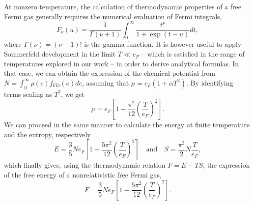 At nonzero temperature, the calculation of thermodynamic properties of a free
Fermi gas generally requires the numerical evaluation of Fermi integrals,
%
\begin{equation}
  F_\nu(u) = \frac{1}{\Gamma(\nu+1)}\int_0^\infty\frac{t^\nu}{1+\exp(t-u)}dt,
\end{equation}
%
where $\Gamma(\nu) = (\nu-1)!$ is the gamma function.
It is however useful to apply Sommerfeld development in the limit $T \ll
e_F$ -- which is satisfied in the range of temperatures explored in our work -- 
in order to derive analytical formulas. In that case, we can obtain the
expression of the chemical potential from $N=\int_0^\infty
\rho(e)f_{\text{FD}}(e)de$, assuming that $\mu=e_F(1+\alpha T^2)$. By
identifying terms scaling as $T^2$, we get
%
\begin{equation}
  \mu = e_F\left[1 - \frac{\pi^2}{12}\left(\frac{T}{e_F}\right)^2\right].
\end{equation}
%
We can proceed in the same manner to calculate the energy at finite
temperature and the entropy, respectively
%
\begin{equation}
  E = \frac{3}{5} N e_F 
  \left[1+\frac{5\pi^2}{12}\left(\frac{T}{e_F}\right)^2\right] \quad \text{and}
  \quad S = \frac{\pi^2}{2}N\frac{T}{e_F},
\end{equation}
%
which finally gives, using the thermodynamic relation $F=E-TS$, the expression
of the free energy of a nonrelativistic free Fermi gas,
%
\begin{equation}
  F = \frac{3}{5} N e_F
  \left[1-\frac{5\pi^2}{12}\left(\frac{T}{e_F}\right)^2\right].
\end{equation}
%

